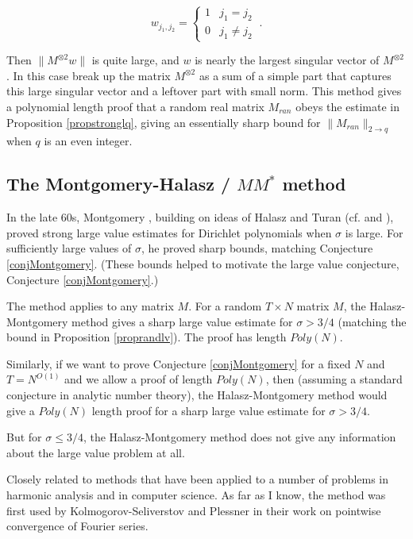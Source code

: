 \documentclass{amsart}
\begin{document}
$$ w_{j_1, j_2} = \begin{cases} 1 & j_1 = j_2 \\  0 & j_1 \not= j_2 \ \end{cases}. $$

\noindent Then $\| M^{\otimes 2} w \|$ is quite large, and $w$ is nearly the largest singular vector of $M^{\otimes 2}$.   In this case \cite{BBHKSZ} break up the matrix $M^{\otimes 2}$ as a sum of a simple part that captures this large singular vector and a leftover part with small norm.   This method gives a polynomial length proof that a random real matrix $M_{ran}$ obeys the estimate in Proposition \ref{propstronglq},  giving an essentially sharp bound for $\| M_{ran} \|_{2 \rightarrow q}$ when $q$ is an even integer.






\subsection{The Montgomery-Halasz / $M M^*$ method}


 In the late 60s,  Montgomery \cite{M}, building on ideas of Halasz and Turan (cf. \cite{H} and \cite{HT}), proved strong large value estimates for Dirichlet polynomials  when $\sigma$ is large.  For sufficiently large values of $\sigma$,  he proved sharp bounds, matching Conjecture \ref{conjMontgomery}.    (These bounds helped to motivate the large value conjecture,  Conjecture \ref{conjMontgomery}.)
 
 The method applies to any matrix $M$.  For a random $T \times N$ matrix $M$, the Halasz-Montgomery method gives a sharp large value estimate for $\sigma > 3/4$ (matching the bound in Proposition \ref{proprandlv}).  The proof has length $Poly(N)$.  
 
 Similarly,  if we want to prove Conjecture \ref{conjMontgomery} for a fixed $N$ and $T = N^{O(1)}$ and we allow a proof of length $Poly(N)$,  then (assuming a standard conjecture in analytic number theory),  the Halasz-Montgomery method would give a $Poly(N)$ length proof for a sharp large value estimate for $\sigma > 3/4$.  
 
But for $\sigma \le 3/4$, the Halasz-Montgomery method does not give any information about the large value problem at all.

Closely related to methods that have been applied to a number of problems in harmonic analysis and in computer science.  As far as I know, the method was first used by Kolmogorov-Seliverstov \cite{KS} and Plessner \cite{P} in their work on pointwise convergence of Fourier series.  
\end{document}
